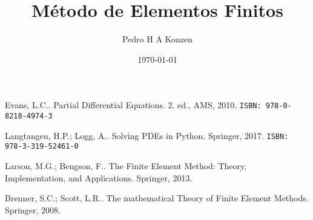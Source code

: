 \documentclass[12pt]{book}
\begin{document}
\ifispython
\lstset { %
  language=Python
}
\fi


\frontmatter

\title{Método de Elementos Finitos}
\author{Pedro H A Konzen}
\date{\today}
\ifishtml
\else
{}
\fi

\maketitle




\tableofcontents
{}

\mainmatter




\ifisbook

\fi

\ifisbook
\clearpage
{}
{}
\fi

\begin{thebibliography}{99}
  Evans, L.C.. Partial Differential Equations. 2. ed., AMS, 2010. \texttt{ISBN: 978-0-8218-4974-3}
  
  Langtangen, H.P.; Logg, A.. Solving PDEs in Python. Springer, 2017. \texttt{ISBN: 978-3-319-52461-0}

  Larson, M.G.; Bengson, F.. The Finite Element Method: Theory, Implementation, and Applications. Springer, 2013.

  Brenner, S.C.; Scott, L.R.. The mathematical Theory of Finite Element Methods. Springer, 2008.
\end{thebibliography}
\nocite{*}
%

\end{document}
